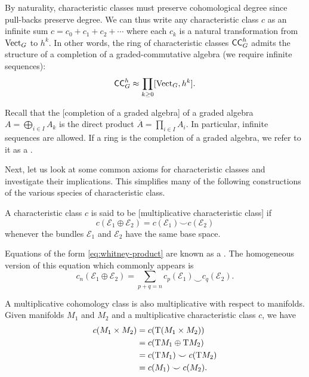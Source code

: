 By naturality, characteristic classes must preserve cohomological degree since pull-backs preserve degree. We can thus write any characteristic class $c$ as an infinite sum $c=c_0+c_1+c_2+\cdots$ where each $c_k$ is a natural transformation from $\operatorname{Vect}_G$ to $h^k$.
In other words, the ring of characteristic classes $\mathsf{CC}_G^h$ admits the structure of a completion of a graded-commutative algebra (we require infinite sequences):
\[
	\mathsf{CC}_G^h \approx \prod_{k \geq 0} [\operatorname{Vect}_G, h^k].
\]
\begin{remark}
	Recall that the [completion of a graded algebra] of a graded algebra $A=\bigoplus_{i\in I} A_k$ is the direct product $\overline{A}=\prod_{i\in I} A_i$. In particular, infinite sequences are allowed. If a ring is the completion of a graded algebra, we refer to it as a .
\end{remark}

Next, let us look at some common axioms for characteristic classes and investigate their implications. This simplifies many of the following constructions of the various species of characteristic class.

\begin{definition}
	A characteristic class $c$ is said to be [multiplicative characteristic class] if \begin{equation}\label{eq:whitney-product}
		c(\mathcal{E}_1\oplus \mathcal{E}_2)=c(\mathcal{E}_1)\smile c(\mathcal{E}_2)
	\end{equation}
	whenever the bundles $\mathcal{E}_1$ and $\mathcal{E}_2$ have the same base space.
\end{definition}

Equations of the form \cref{eq:whitney-product} are known as a . The homogeneous version of this equation which commonly appears is
\[
	c_n(\mathcal{E}_1\oplus \mathcal{E}_2) = \sum_{p+q=n}c_p(\mathcal{E}_1)\smile c_q(\mathcal{E}_2).
\]

\begin{remark}
	A multiplicative cohomology class is also multiplicative with respect to manifolds. Given manifolds $M_1$ and $M_2$ and a multiplicative characteristic class $c$, we have
	\[
		\begin{aligned}
			c(M_1\times M_2) & = c(\mathrm{T}(M_1\times M_2))      \\
			                 & = c(\mathrm{T} M_1\oplus \mathrm{T} M_2)    \\
			                 & = c(\mathrm{T} M_1)\smile c(\mathrm{T} M_2) \\
			                 & = c(M_1)\smile c(M_2).
		\end{aligned}
	\]
\end{remark}

